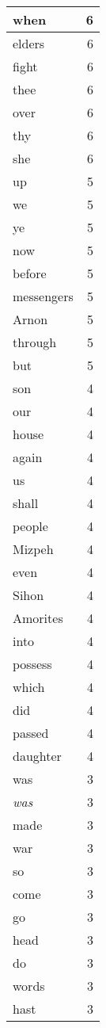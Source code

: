 \begin{center}
\begin{longtable}{l|r}
when & 6\\ \hline 
elders & 6\\ \hline 
fight & 6\\ \hline 
thee & 6\\ \hline 
over & 6\\ \hline 
thy & 6\\ \hline 
she & 6\\ \hline 
up & 5\\ \hline 
we & 5\\ \hline 
ye & 5\\ \hline 
now & 5\\ \hline 
before & 5\\ \hline 
messengers & 5\\ \hline 
Arnon & 5\\ \hline 
through & 5\\ \hline 
but & 5\\ \hline 
son & 4\\ \hline 
our & 4\\ \hline 
house & 4\\ \hline 
again & 4\\ \hline 
us & 4\\ \hline 
shall & 4\\ \hline 
people & 4\\ \hline 
Mizpeh & 4\\ \hline 
even & 4\\ \hline 
Sihon & 4\\ \hline 
Amorites & 4\\ \hline 
into & 4\\ \hline 
possess & 4\\ \hline 
which & 4\\ \hline 
did & 4\\ \hline 
passed & 4\\ \hline 
daughter & 4\\ \hline 
was & 3\\ \hline 
\emph{was} & 3\\ \hline 
made & 3\\ \hline 
war & 3\\ \hline 
so & 3\\ \hline 
come & 3\\ \hline 
go & 3\\ \hline 
head & 3\\ \hline 
do & 3\\ \hline 
words & 3\\ \hline 
hast & 3\\ \hline 

\end{longtable}
\end{center}
